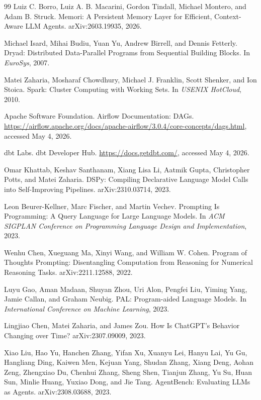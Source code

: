 \documentclass{article}
\begin{document}
\begin{thebibliography}{99}
Luiz C. Borro, Luiz A. B. Macarini, Gordon Tindall, Michael Montero, and Adam B. Struck.
\newblock Memori: A Persistent Memory Layer for Efficient, Context-Aware LLM Agents.
\newblock arXiv:2603.19935, 2026.

Michael Isard, Mihai Budiu, Yuan Yu, Andrew Birrell, and Dennis Fetterly.
\newblock Dryad: Distributed Data-Parallel Programs from Sequential Building Blocks.
\newblock In \emph{EuroSys}, 2007.

Matei Zaharia, Mosharaf Chowdhury, Michael J. Franklin, Scott Shenker, and Ion Stoica.
\newblock Spark: Cluster Computing with Working Sets.
\newblock In \emph{USENIX HotCloud}, 2010.

Apache Software Foundation.
\newblock Airflow Documentation: DAGs.
\newblock \url{https://airflow.apache.org/docs/apache-airflow/3.0.4/core-concepts/dags.html}, accessed May 4, 2026.

dbt Labs.
\newblock dbt Developer Hub.
\newblock \url{https://docs.getdbt.com/}, accessed May 4, 2026.

Omar Khattab, Keshav Santhanam, Xiang Lisa Li, Aatmik Gupta, Christopher Potts, and Matei Zaharia.
\newblock DSPy: Compiling Declarative Language Model Calls into Self-Improving Pipelines.
\newblock arXiv:2310.03714, 2023.

Leon Beurer-Kellner, Marc Fischer, and Martin Vechev.
\newblock Prompting Is Programming: A Query Language for Large Language Models.
\newblock In \emph{ACM SIGPLAN Conference on Programming Language Design and Implementation}, 2023.

Wenhu Chen, Xueguang Ma, Xinyi Wang, and William W. Cohen.
\newblock Program of Thoughts Prompting: Disentangling Computation from Reasoning for Numerical Reasoning Tasks.
\newblock arXiv:2211.12588, 2022.

Luyu Gao, Aman Madaan, Shuyan Zhou, Uri Alon, Pengfei Liu, Yiming Yang, Jamie Callan, and Graham Neubig.
\newblock PAL: Program-aided Language Models.
\newblock In \emph{International Conference on Machine Learning}, 2023.

Lingjiao Chen, Matei Zaharia, and James Zou.
\newblock How Is ChatGPT's Behavior Changing over Time?
\newblock arXiv:2307.09009, 2023.

Xiao Liu, Hao Yu, Hanchen Zhang, Yifan Xu, Xuanyu Lei, Hanyu Lai, Yu Gu, Hangliang Ding, Kaiwen Men, Kejuan Yang, Shudan Zhang, Xiang Deng, Aohan Zeng, Zhengxiao Du, Chenhui Zhang, Sheng Shen, Tianjun Zhang, Yu Su, Huan Sun, Minlie Huang, Yuxiao Dong, and Jie Tang.
\newblock AgentBench: Evaluating LLMs as Agents.
\newblock arXiv:2308.03688, 2023.


\end{thebibliography}
\end{document}
